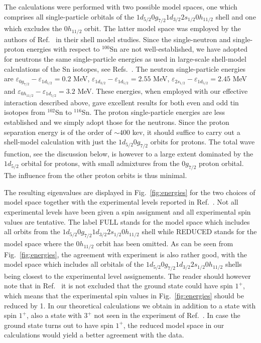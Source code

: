 The calculations were performed with two possible 
model spaces, one which comprises all single-particle orbitals of the 
$1d_{5/2}0g_{7/2}1d_{3/2}2s_{1/2}0h_{11/2}$ shell and one which excludes
the $0h_{11/2}$ orbit. 
The latter model space was employed by the authors of Ref.\ \cite{sb106}
in their shell model studies.
Since the single-neutron and single-proton
energies with respect to $^{100}$Sn are not well-established, we have adopted
for neutrons the same single-particle energies as used in large-scale
shell-model calculations of the Sn isotopes, see Refs.\ \cite{ehho98}.
The neutron single-particle energies are
$\varepsilon_{0g_{7/2}}-\varepsilon_{1d_{5/2}}=0.2$ MeV,
$\varepsilon_{1d_{3/2}}-\varepsilon_{1d_{5/2}}=2.55$ MeV,
$\varepsilon_{2s_{1/2}}-\varepsilon_{1d_{5/2}}=2.45$ MeV and
$\varepsilon_{0h_{11/2}}-\varepsilon_{1d_{5/2}}=3.2$ MeV.
These energies, when employed with our effective interaction described
above, gave excellent results for both even and odd
tin isotopes from $^{102}$Sn to $^{116}$Sn. 
The proton single-particle energies are less established and we simply adopt 
those for the neutrons. Since the proton separation energy is of the order
of $\sim 400$ kev, it should suffice to carry out a shell-model
calculation with just the $1d_{5/2}0g_{7/2}$ orbits for protons.
The total wave function, see the discussion below, is however
to a large extent 
dominated by the $1d_{5/2}$ orbital for protons, with small admixtures
from the $0g_{7/2}$ proton orbital. The influence from the other 
proton orbits is thus minimal. 

The resulting eigenvalues are displayed in Fig.\ \ref{fig:energies}
for the two choices of model space together with the experimental
levels reported in Ref.\ \cite{sb106}. Not all experimental
levels have been given a spin assignment and all experimental spin values
are tentative.  
The label FULL stands for the model space which includes all orbits
from the $1d_{5/2}0g_{7/2}1d_{3/2}2s_{1/2}0h_{11/2}$ shell while
REDUCED stands for the model space where the $0h_{11/2}$ orbit has been
omitted.
As can be seen from Fig.\ \ref{fig:energies}, the agreement with
experiment is also rather good, with the model space which includes
all orbitals of the $1d_{5/2}0g_{7/2}1d_{3/2}2s_{1/2}0h_{11/2}$ shells
being closest to the experimental level assignements.
The reader should however note that in Ref.\ \cite{sb106} it is not
excluded that the ground state could have spin $1^+$, which means
that the experimental spin values in Fig.\ \ref{fig:energies} 
should be reduced by 1. In our theoretical calculations we obtain in
addition to a state with spin $1^+$, also a state with $3^+$ not seen
in the experiment of Ref.\ \cite{sb106}. In case the ground state
turns out to have spin $1^+$, the reduced model space in our calculations
would yield a better agreement with the data.

